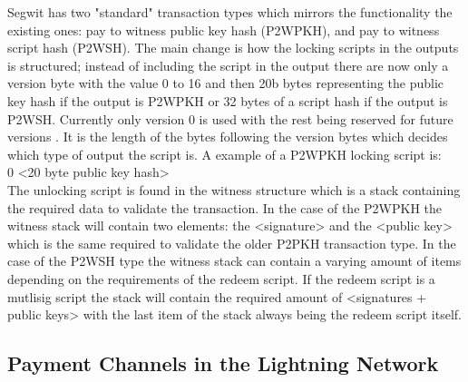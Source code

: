 Segwit has two "standard" transaction types which mirrors the functionality the existing ones: pay to witness public key hash (P2WPKH), and pay to witness script hash (P2WSH). The main change is how the locking scripts in the outputs is structured; instead of including the script in the output there are now only a version byte with the value 0 to 16 and then 20b bytes representing the public key hash if the output is P2WPKH or 32 bytes of a script hash if the output is P2WSH. Currently only version 0 is used with the rest being reserved for future versions \cite{BIP141}. It is the length of the bytes following the version bytes which decides which type of output the script is. A example of a P2WPKH locking script is:
\\

0 <20 byte public key hash>
\\

The unlocking script is found in the witness structure which is a stack containing the required data to validate the transaction.
In the case of the P2WPKH the witness stack will contain two elements: the <signature> and the <public key> which is the same required to validate the older P2PKH transaction type. In the case of the P2WSH type the witness stack can contain a varying amount of items depending on the requirements of the redeem script. If the redeem script is a mutlisig script the stack will contain the required amount of <signatures + public keys> with the last item of the stack always being the redeem script itself.

\subsection{Payment Channels in the Lightning Network} 
\label{subsec:pcln}

